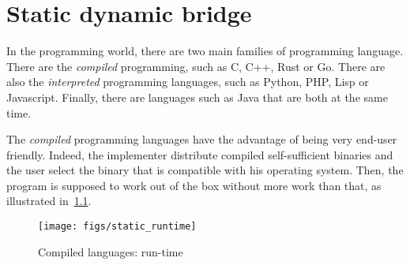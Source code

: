\chapter{Static dynamic bridge}
\label{chap.static_dynamic_bridge}


In the programming world, there are two main families of programming language. There are the \emph{compiled}
programming, such as C, C++, Rust or Go. There are also the \emph{interpreted} programming languages, such as Python,
PHP, Lisp or Javascript. Finally, there are languages such as Java that are both at the same time.

The \emph{compiled} programming languages have the advantage of being very end-user friendly. Indeed, the implementer
distribute compiled self-sufficient binaries and the user select the binary that is compatible with his operating
system. Then, the program is supposed to work out of the box without more work than that, as illustrated
in~\cref{fig:static.dynamic.compiled.runtime}.

\begin{figure}[tbh]
  \centering
  \texttt{[image: figs/static\_runtime]}
  \caption{Compiled languages: run-time}
  \label{fig:static.dynamic.compiled.runtime}
\end{figure}


